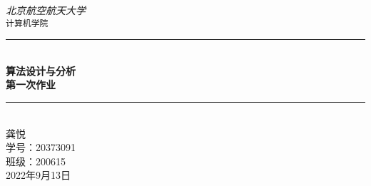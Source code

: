 \documentclass[11pt]{article}
\newcommand{\artdate}{2022年9月13日}
\begin{document}
 
 \begin{titlepage}
 
     \newcommand{\HRule}{\rule{\linewidth}{0.5mm}}
   
     \vfill
     \center 
     
     \textit{\Large 北京航空航天大学}\\[0.5cm] 
     \texttt{\Large 计算机学院}
   
     \vspace{3 cm}
     \HRule \\[0.4cm]
     { \huge \bfseries 算法设计与分析}\\[0.4cm]
     { \huge \bfseries 第一次作业}\\
     \HRule \\[1cm]
 
     \vspace{2.5 cm}
     龚悦\\
     学号：20373091\\
     班级：200615\\
 
     \vspace{1 cm}
     {\large \artdate}\\[3cm] 
   
   \vfill
   
 \end{titlepage}
 
 
 
 
\end{document}
